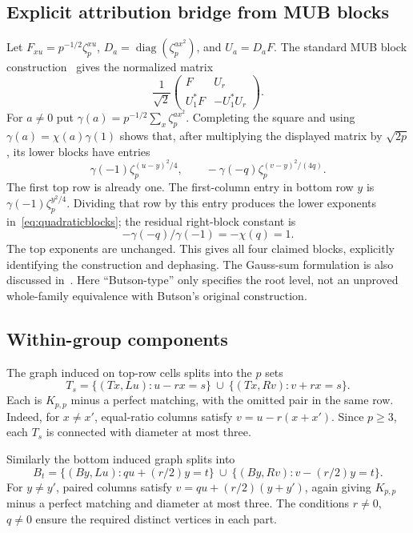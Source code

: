 \subsection{Explicit attribution bridge from MUB blocks}
Let $F_{xu}=p^{-1/2}\zeta_p^{xu}$, $D_a=\operatorname{diag}(\zeta_p^{ax^2})$, and $U_a=D_aF$. The standard MUB block construction~\cite[Theorem 3 and its two-block specializations]{MW} gives the normalized matrix
\[
 \frac1{\sqrt2}\begin{pmatrix}F&U_r\\U_1^*F&-U_1^*U_r\end{pmatrix}.
\]
For $a\ne0$ put $\gamma(a)=p^{-1/2}\sum_x\zeta_p^{ax^2}$. Completing the square and using $\gamma(a)=\chi(a)\gamma(1)$ shows that, after multiplying the displayed matrix by $\sqrt{2p}$, its lower blocks have entries
\[
 \gamma(-1)\zeta_p^{(u-y)^2/4},\qquad
 -\gamma(-q)\zeta_p^{(v-y)^2/(4q)}.
\]
The first top row is already one. The first-column entry in bottom row $y$ is $\gamma(-1)\zeta_p^{y^2/4}$. Dividing that row by this entry produces the lower exponents in~\eqref{eq:quadraticblocks}; the residual right-block constant is
\[
 -\gamma(-q)/\gamma(-1)=-\chi(q)=1.
\]
The top exponents are unchanged. This gives all four claimed blocks, explicitly identifying the construction and dephasing. The Gauss-sum formulation is also discussed in~\cite[Section 4]{BOP}. Here ``Butson-type'' only specifies the root level, not an unproved whole-family equivalence with Butson's original construction.

\subsection{Within-group components}
The graph induced on top-row cells splits into the $p$ sets
\[
 T_s=\{(Tx,Lu):u-rx=s\}\ \cup\ \{(Tx,Rv):v+rx=s\}.
\]
Each is $K_{p,p}$ minus a perfect matching, with the omitted pair in the same row. Indeed, for $x\ne x'$, equal-ratio columns satisfy $v=u-r(x+x')$. Since $p\ge3$, each $T_s$ is connected with diameter at most three.

Similarly the bottom induced graph splits into
\[
 B_t=\{(By,Lu):qu+(r/2)y=t\}\ \cup\ \{(By,Rv):v-(r/2)y=t\}.
\]
For $y\ne y'$, paired columns satisfy $v=qu+(r/2)(y+y')$, again giving $K_{p,p}$ minus a perfect matching and diameter at most three. The conditions $r\ne0$, $q\ne0$ ensure the required distinct vertices in each part.

